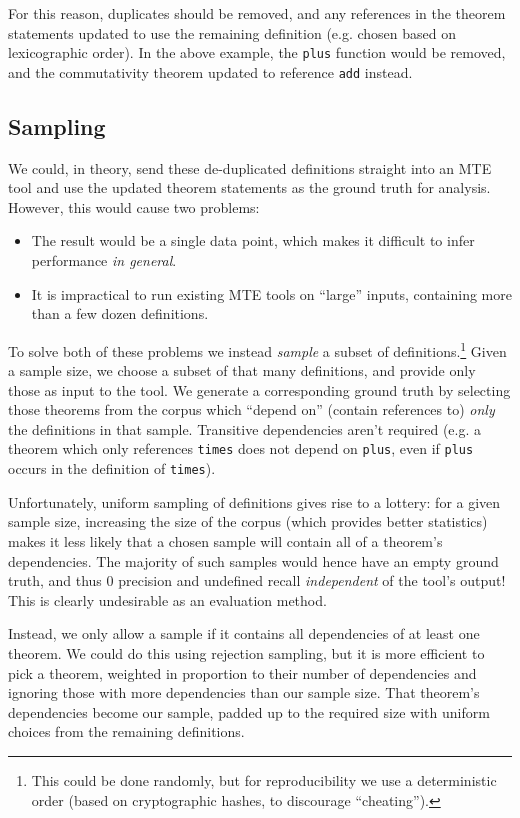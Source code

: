 For this reason, duplicates should be removed, and any references in the theorem
statements updated to use the remaining definition (e.g. chosen based on
lexicographic order). In the above example, the \texttt{plus} function would be
removed, and the commutativity theorem updated to reference \texttt{add}
instead.

\subsection{Sampling}

We could, in theory, send these de-duplicated definitions straight into an MTE
tool and use the updated theorem statements as the ground truth for analysis.
However, this would cause two problems:

\begin{itemize}
\item The result would be a single data point, which makes it difficult to
  infer performance \emph{in general}.
\item It is impractical to run existing MTE tools on ``large'' inputs,
  containing more than a few dozen definitions.
\end{itemize}

To solve both of these problems we instead \emph{sample} a subset of
definitions.\footnote{This could be done randomly, but for reproducibility we
  use a deterministic order (based on cryptographic hashes, to discourage
  ``cheating'').} Given a sample size, we choose a subset of that many definitions,
and provide only those as input to the tool. We generate a corresponding
ground truth by selecting those theorems from the corpus which ``depend on''
(contain references to) \emph{only} the definitions in that sample. Transitive
dependencies aren't required (e.g. a theorem which only references
\texttt{times} does not depend on \texttt{plus}, even if \texttt{plus} occurs in
the definition of \texttt{times}).

Unfortunately, uniform sampling of definitions gives rise to a lottery: for a
given sample size, increasing the size of the corpus (which provides better
statistics) makes it less likely that a chosen sample will contain all of
a theorem's dependencies. The majority of such samples would hence have an empty
ground truth, and thus $0$ precision and undefined recall \emph{independent} of
the tool's output! This is clearly undesirable as an evaluation method.

Instead, we only allow a sample if it contains all dependencies of at least one
theorem. We could do this using rejection sampling, but it is more efficient to
pick a theorem, weighted in proportion to their number of dependencies and
ignoring those with more dependencies than our sample size. That theorem's
dependencies become our sample, padded up to the required size with uniform
choices from the remaining definitions.

